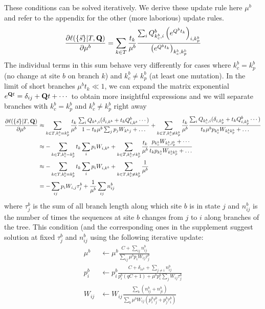 \documentclass[aps,rmp,twocolumn]{revtex4}
\newcommand{\mat}[1]{{\bf #1}}
\newcommand{\eqp}{p}
\begin{document}
These conditions can be solved iteratively. We derive these update rule here $\mu^b$ and refer to the appendix for the other (more laborious) update rules.
\begin{equation}
	\frac{\partial \ell(\{\vec{s}\}|T,\mat{Q})}{\partial \mu^b} = \sum_{k\in T} \frac{t_k}{\mu^b}\frac{\sum_i Q^b_{k^b_c,i}\left( e^{Q^bt_k} \right)_{i, k^b_p}}{\left( e^{Q^bt_k} \right)_{k^b_c, k^b_p}}
\end{equation}
The individual terms in this sum behave very differently for cases where $k^b_c=k^b_p$ (no change at site $b$ on branch $k$) and $k^b_c\neq k^b_p$ (at least one mutation).
In the limit of short branches $\mu^b t_k\ll 1$, we can expand the matrix exponential $e^{\mat{Q}t}=\delta_{ij} + \mat{Q}t+\cdots$ to obtain more insightful expressions and we will separate branches with $k^b_c=k^b_p$  and $k^b_c\neq k^b_p$ right away
\begin{equation}
\begin{split}
	\frac{\partial \ell(\{\vec{s}\}|T,\mat{Q})}{\partial \mu^b} &\approx \sum_{k\in T, k^b_c=k^b_p} \frac{t_k}{\mu^b}\frac{\sum_i Q_{k^b,i}(\delta_{i,k^b} + t_k Q^b_{i,k^b}\cdots)}{1 - t_k\mu^b\sum_{j}\eqp_j W_{k^bj}+\ldots} +
	\sum_{k\in T, k^b_c\neq k^b_p} \frac{t_k}{\mu^b}\frac{\sum_i Q_{k^b_c,i}(\delta_{i,k^b_p} + t_k Q^b_{i,k^b_p}\cdots)}{t_k\mu^b\eqp_{k^b_c} W_{k^b_ck^b_p}+\ldots} \\
		&\approx -\sum_{k\in T, k^b_c=k^b_p}t_k \sum_i \eqp_{i}W_{i,k^b} +
	\sum_{k\in T, k^b_c\neq k^b_p} \frac{t_k}{\mu^b}\frac{p_{k^b_c}W_{k^b_c, l^b_p} + \cdots}{t_k\eqp_{k^b_c} W_{k^b_ck^b_p}+\ldots} \\
		&\approx -\sum_{k\in T, k^b_c=k^b_p}t_k \sum_i \eqp_{i}W_{i,k^b} + 	\sum_{k\in T, k^b_c\neq k^b_p} \frac{1}{\mu^b} \\
		&= -\sum_{ij}\eqp_{i}W_{i,j}\tau_j^b + \frac{1}{\mu^b}\sum_{ij} n^b_{ij}
	\end{split}
\end{equation}
where $\tau^b_j$ is the sum of all branch length along which site $b$ is in state $j$ and $n^b_{ij}$ is the number of times the sequences at site $b$ changes from $j$ to $i$ along branches of the tree.
This condition (and the corresponding ones in the supplement suggest solution at fixed $\tau^b_j$ and $n^b_{ij}$ using the following iterative update:
\begin{equation}
\label{eq:update}
	\begin{split}
		\mu^b & \leftarrow \mu^b\frac{C+\sum_{ij} n^b_{ij}}{\sum_{ij}\mu^b \eqp_{i}W_{ij}\tau_j^b} \\
		\eqp^b_i & \leftarrow \eqp^b_i\frac{C+\delta_{is^{b}} + \sum_{j\neq i} n^b_{ij}}{\eqp^b_i(qC+1) + \mu^b\eqp^b_i \sum_{j}W_{ij}\tau_j^b} \\
		W_{ij} & \leftarrow W_{ij}\frac{\sum_b (n^b_{ij}+n^b_{ji})}{\sum_b \mu^b W_{ij}(\eqp_i^b\tau_j^b + \eqp_j^b \tau_i^b)} \\
	\end{split}
\end{equation}
\end{document}
